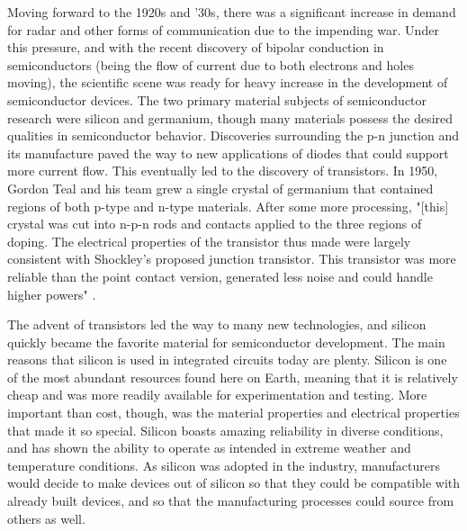 \documentclass[12pt]{article}
\begin{document}
\begin{flushleft}
Moving forward to the 1920s and '30s, there was a significant
increase in demand for radar and other forms of communication
due to the impending war. Under this pressure, and
with the recent discovery of bipolar conduction in
semiconductors (being the flow of current due to both
electrons and holes moving), the scientific scene was
ready for heavy increase in the development of semiconductor
devices. The two primary material subjects of semiconductor
research were silicon and germanium, though many materials
possess the desired qualities in semiconductor behavior.
Discoveries surrounding the p-n junction and its manufacture
paved the way to new applications of diodes that could
support more current flow. This eventually led to the
discovery of transistors. In 1950, Gordon Teal and
his team grew a single crystal of germanium that contained
regions of both p-type and n-type materials. After
some more processing, "[this] crystal was cut into
n-p-n rods and contacts applied to the three regions
of doping. The electrical properties of the transistor
thus made were largely consistent with Shockley's proposed
junction transistor. This transistor was more reliable
than the point contact version, generated less noise
and could handle higher powers" \parencite{TudorJenkins_2005}.

The advent of transistors led the way to many new technologies,
and silicon quickly became the favorite material for
semiconductor development. The main reasons that silicon
is used in integrated circuits today are plenty. Silicon
is one of the most abundant resources found here on
Earth, meaning that it is relatively cheap and was
more readily available for experimentation and testing.
More important than cost, though, was the material
properties and electrical properties that made it so
special. Silicon boasts amazing reliability in diverse
conditions, and has shown the ability to operate as
intended in extreme weather and temperature conditions.
As silicon was adopted in the industry, manufacturers
would decide to make devices out of silicon so that
they could be compatible with already built devices,
and so that the manufacturing processes could source
from others as well.


\end{flushleft}
\end{document}
